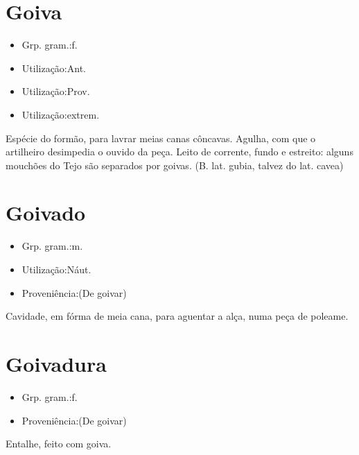 \section{Goiva}
\begin{itemize}
\item {Grp. gram.:f.}
\end{itemize}
\begin{itemize}
\item {Utilização:Ant.}
\end{itemize}
\begin{itemize}
\item {Utilização:Prov.}
\end{itemize}
\begin{itemize}
\item {Utilização:extrem.}
\end{itemize}
Espécie do formão, para lavrar meias canas côncavas.
Agulha, com que o artilheiro desimpedia o ouvido da peça.
Leito de corrente, fundo e estreito: \textunderscore alguns mouchões do Tejo são separados por goivas\textunderscore .
(B. lat. \textunderscore gubia\textunderscore , talvez do lat. \textunderscore cavea\textunderscore )
\section{Goivado}
\begin{itemize}
\item {Grp. gram.:m.}
\end{itemize}
\begin{itemize}
\item {Utilização:Náut.}
\end{itemize}
\begin{itemize}
\item {Proveniência:(De \textunderscore goivar\textunderscore )}
\end{itemize}
Cavidade, em fórma de meia cana, para aguentar a alça, numa peça de poleame.
\section{Goivadura}
\begin{itemize}
\item {Grp. gram.:f.}
\end{itemize}
\begin{itemize}
\item {Proveniência:(De \textunderscore goivar\textunderscore )}
\end{itemize}
Entalhe, feito com goiva.

